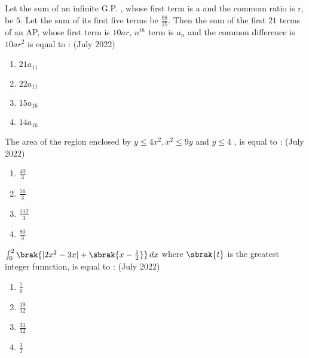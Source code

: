      \item Let the sum of an infinite G.P. , whose first term is a and the commom ratio is r, be $5$. Let the sum of its first five terms be $\frac{98}{25}.$ Then the sum of the first $21$ terms of an AP, whose first term is $10ar$, $n^{th}$ term is $a_n$ and the common difference is $10ar^{2}$ is equal to :
     \hfill(July 2022)
     \begin{enumerate}
         \item $21a_{11}$
         \item $22a_{11}$
         \item $15a_{16}$
         \item $14 a_{16}$
    \end{enumerate}


    \item The area of the region enclosed by $y \le 4x^2 , x^2 \le 9y$ and $y \le 4$ , is equal to :
    \hfill(July 2022)
    \begin{enumerate}
        \item $\frac{40}{3}$
        \item $\frac{56}{3}$
        \item $\frac{112}{3}$
        \item $\frac{80}{3}$     
    \end{enumerate}


    \item $\int_{0}^2 \brak{|2x^{2} - 3x|+ \sbrak{x -\frac{1}{2}}}\, dx$ where $\sbrak{t}$ is the greatest integer funnction, is equal to :
    \hfill(July 2022)
    \begin{enumerate}
        \item $\frac{7}{6}$ 
        \item $\frac{19}{12}$ 
        \item $\frac{31}{12}$ 
        \item $\frac{3}{2}$
    \end{enumerate}


